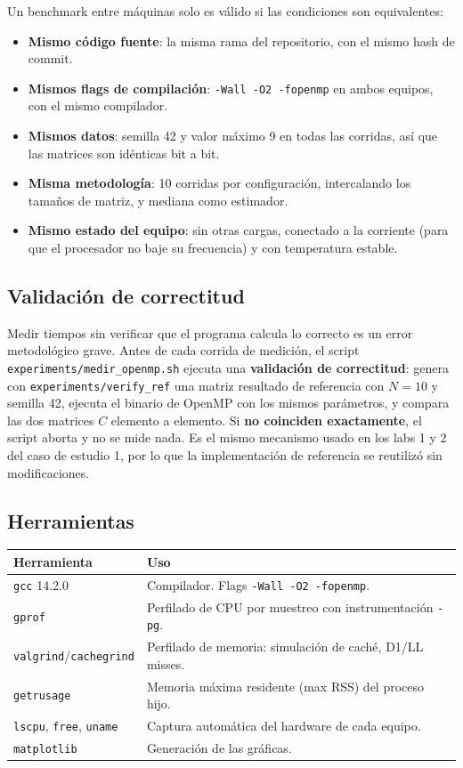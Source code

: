 Un benchmark entre máquinas solo es válido si las condiciones son equivalentes:

\begin{itemize}
    \item \textbf{Mismo código fuente}: la misma rama del repositorio, con el mismo hash de commit.
    \item \textbf{Mismos flags de compilación}: \texttt{-Wall -O2 -fopenmp} en ambos equipos, con el mismo compilador.
    \item \textbf{Mismos datos}: semilla 42 y valor máximo 9 en todas las corridas, así que las matrices son idénticas bit a bit.
    \item \textbf{Misma metodología}: 10 corridas por configuración, intercalando los tamaños de matriz, y mediana como estimador.
    \item \textbf{Mismo estado del equipo}: sin otras cargas, conectado a la corriente (para que el procesador no baje su frecuencia) y con temperatura estable.
\end{itemize}

\subsection{Validación de correctitud}

Medir tiempos sin verificar que el programa calcula lo correcto es un error metodológico grave. Antes de cada corrida de medición, el script \texttt{experiments/medir\_openmp.sh} ejecuta una \textbf{validación de correctitud}: genera con \texttt{experiments/verify\_ref} una matriz resultado de referencia con $N=10$ y semilla 42, ejecuta el binario de OpenMP con los mismos parámetros, y compara las dos matrices $C$ elemento a elemento. Si \textbf{no coinciden exactamente}, el script aborta y no se mide nada. Es el mismo mecanismo usado en los labs 1 y 2 del caso de estudio 1, por lo que la implementación de referencia se reutilizó sin modificaciones.

\subsection{Herramientas}

\begin{center}
\begin{tabular}{|l|p{8.5cm}|}
\hline
\textbf{Herramienta} & \textbf{Uso} \\
\hline
\texttt{gcc} 14.2.0 & Compilador. Flags \texttt{-Wall -O2 -fopenmp}. \\
\texttt{gprof} & Perfilado de CPU por muestreo con instrumentación \texttt{-pg}. \\
\texttt{valgrind}/\texttt{cachegrind} & Perfilado de memoria: simulación de caché, D1/LL misses. \\
\texttt{getrusage} & Memoria máxima residente (max RSS) del proceso hijo. \\
\texttt{lscpu}, \texttt{free}, \texttt{uname} & Captura automática del hardware de cada equipo. \\
\texttt{matplotlib} & Generación de las gráficas. \\
\hline
\end{tabular}
\end{center}

